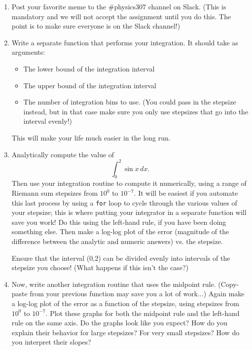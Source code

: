 \documentclass[12pt]{article}
\begin{document}
\begin{enumerate}

\item Post your favorite meme to the \#physics307 channel on Slack. (This is mandatory and we will not accept the assignment until you do this. The point is to make sure everyone is on the Slack channel!)

\item{Write a separate function that performs your integration. It should take as arguments:
	
	\begin{itemize}
		\item The lower bound of the integration interval
		\item The upper bound of the integration interval
		\item The number of integration bins to use. (You could pass in the stepsize instead, but
		in that case make sure you only use stepsizes that go into the interval evenly!)
	\end{itemize}
	
	This will make your life much easier in the long run.}

\item{Analytically compute the value of $$\int_{0}^{2} \sin x\, dx.$$ Then use your integration routine to compute it numerically, using a range of Riemann sum stepsizes from $10^{0}$
    to $10^{-7}$. It will be easiest if you automate this last process by using a {\tt for} loop to cycle through the various values of your stepsize; this is where putting your integrator in a separate function will save you work! Do this using the left-hand rule, if you have been doing something else. 
  Then make a log-log plot of the error (magnitude of the difference between the analytic and numeric answers) vs. the stepsize.

Ensure that the interval (0,2) can be divided evenly into intervals of the stepsize you choose! (What happens if this isn't the case?)}

\item{Now, write another integration routine that uses the midpoint rule. (Copy-paste from your previous function may save you a lot of work...) Again make a log-log plot of the error as a function of the stepsize, using stepsizes from $10^{0}$ to $10^{-7}$.
    Plot these graphs for both the midpoint rule and the left-hand rule on the same axis. Do the graphs look like you expect? How do you explain their behavior for large stepsizes?
  For very small stepsizes? How do you interpret their slopes?}


\end{enumerate}
\end{document}
